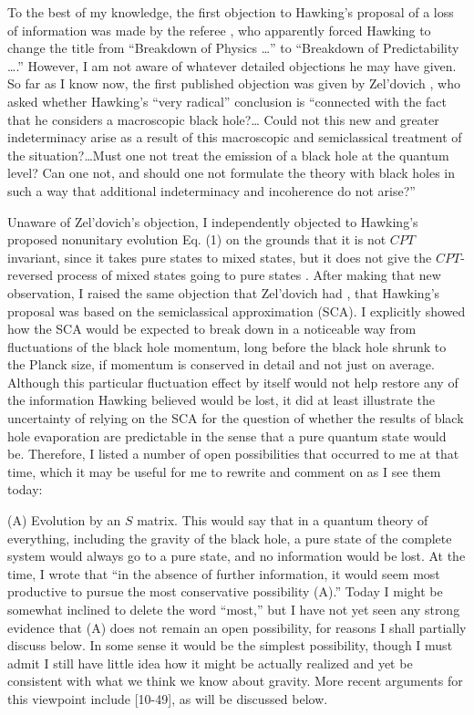 \documentclass[12pt]{article}
\begin{document}
     To the best of my knowledge, the first objection to Hawking's
proposal
of a loss of information was made by the referee \cite{Hawpri}, who
apparently forced Hawking to change the title from ``Breakdown of
Physics \ldots '' to ``Breakdown of Predictability \ldots .''
However, I am
not aware of whatever detailed objections he may have given.  So far
as I
know now, the first published objection was given by Zel'dovich
\cite{Zel77b},
who asked whether Hawking's ``very radical'' conclusion is
``connected
with the fact that he considers a macroscopic black hole?\ldots
Could not
this new and greater indeterminacy arise as a result of this
macroscopic
and semiclassical treatment of the situation?\ldots  Must one not
treat
the emission of a black hole at the quantum level?  Can one not, and
should one not formulate the theory with black holes in such a way
that
additional indeterminacy and incoherence do not arise?''

     Unaware of Zel'dovich's objection, I independently objected to
Hawking's proposed nonunitary evolution Eq. (1) on the grounds that
it
is not $CPT$ invariant, since it takes
pure states to mixed states, but it does not give the $CPT$-reversed
process of
mixed states going to pure states \cite{Pag80}.  After making that
new
observation, I raised the same objection that Zel'dovich had
\cite{Zel77b},
that Hawking's proposal was based on the semiclassical approximation
(SCA).
I explicitly showed how the SCA
would be expected to break down in a noticeable way
from fluctuations of the black hole momentum, long before the black
hole shrunk
to the Planck size, if momentum is conserved in detail and not just
on average.
Although this particular fluctuation effect by itself would not help
restore
any of the information Hawking believed would be lost, it did at
least
illustrate the uncertainty of relying on the SCA for
the question of whether the results of black hole evaporation are
predictable
in the sense that a pure quantum state would be.  Therefore, I listed
a number
of open possibilities that occurred to me at that time, which it may
be useful
for me to rewrite and comment on as I see them today:

     (A) Evolution by an $S$ matrix.  This would say that in a
quantum theory
of everything, including the gravity of the black hole, a pure state
of the
complete system would always go to a pure state, and no information
would be
lost.  At the time, I wrote that ``in the absence of further
information, it
would seem most productive to pursue the most conservative
possibility (A).''
Today I might be somewhat inclined to delete the word ``most,'' but I
have not
yet seen any strong evidence that (A) does not remain an open
possibility, for
reasons I shall partially discuss below.  In some sense it would be
the
simplest possibility, though I must admit I still have little idea
how it might
be actually realized and yet be consistent with what we think we know
about
gravity.  More recent arguments for this viewpoint include
[10-49], as will be discussed below.
\end{document}
